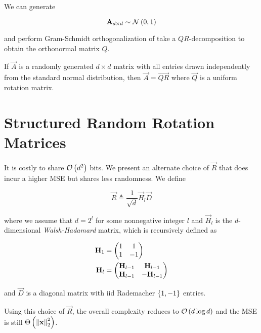 \documentclass[twoside]{article}
\begin{document}
We can generate

\begin{equation}
    \boldsymbol{\mathbf{A}}_{d\times d} \sim \mathcal N\left(0,1\right)
    \label{eq:A-def}
\end{equation}

and perform Gram-Schmidt orthogonalization of take a \(QR\)-decomposition to 
obtain the orthonormal matrix \(Q\).

\begin{lemma}
    If \(\vec{A}\) is a randomly generated \(d\times d\) matrix with all 
    entries drawn independently from the standard normal distribution, then
    \(\vec{A}=\vec{QR}\) where \(\vec{Q}\) is a uniform rotation matrix.
\end{lemma}

\section{Structured Random Rotation Matrices}

It is costly to share \(\mathcal O\left(d^2\right)\) bits. We present an alternate choice of
\(\vec{R}\) that does incur a higher MSE but shares less randomness. We define

\begin{equation}
\vec{R} \triangleq \frac{1}{\sqrt{d}}\vec{H}_l\vec{D}
    \label{eq:r-alt-def}
\end{equation}

where we assume that \(d = 2^l\) for some nonnegative integer \(l\) and
\(\vec{H}_l\) is the \(d\)-dimensional \emph{Walsh-Hadamard} matrix, which is
recursively defined as

\begin{align}
    \boldsymbol{\mathbf{H}}_1 &= \begin{pmatrix}1 & 1 \\ 1 & -1\end{pmatrix} \\
    \boldsymbol{\mathbf{H}}_l &= \begin{pmatrix}\boldsymbol{\mathbf{H}}_{l-1} & \boldsymbol{\mathbf{H}}_{l-1} \\ \boldsymbol{\mathbf{H}}_{l-1} & -\boldsymbol{\mathbf{H}}_{l-1}\end{pmatrix}
    \label{eq:wh-def}
\end{align}

and \(\vec{D}\) is a diagonal matrix with iid Rademacher \(\left\{1,-1\right\}\)
entries.

Using this choice of \(\vec{R}\), the overall complexity reduces to
\(\mathcal O\left(d\log{d}\right)\) and the MSE is still \(\Theta\left(\left\lVert\boldsymbol{\mathbf{x}}\right\rVert_2^2\right)\).
\end{document}
